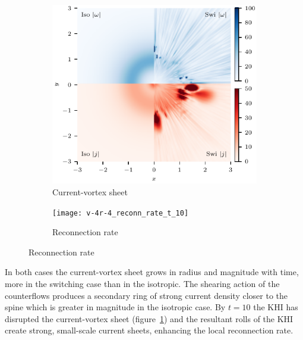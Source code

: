 \begin{figure}[t]
  \centering
    \begin{subfigure}{0.48\textwidth}
      \includegraphics[width=\linewidth]{v-4r-4_vorticity_current_ring_t_10}
      \caption{Current-vortex sheet}
      \label{fig:v-4r-4_vorticity_current_ring_t_10}
    \end{subfigure}
    \hfill
    \begin{subfigure}{0.48\textwidth}
      \texttt{[image: v-4r-4\_reconn\_rate\_t\_10]}
      \caption{Reconnection rate}
      \label{fig:v-4r-4_reconn_rate_t_10}
    \end{subfigure}
\end{figure}

In both cases the current-vortex sheet grows in radius and magnitude with time, more in the switching case than in the isotropic. The shearing action of the counterflows produces a secondary ring of strong current density closer to the spine which is greater in magnitude in the isotropic case. By $t=10$ the KHI has disrupted the current-vortex sheet (figure~\ref{fig:v-4r-4_vorticity_current_ring_t_10}) and the resultant rolls of the KHI create strong, small-scale current sheets, enhancing the local reconnection rate. 

